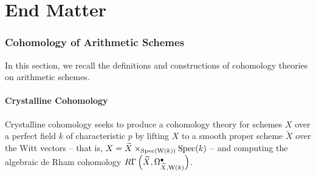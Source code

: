 \part*{End Matter}
\appendix
\section{Cohomology of Arithmetic Schemes}\label{app: cohomology of arithmetic schemes}
In this section, we recall the definitions and constructions of cohomology theories on arithmetic schemes. 
\subsection{Crystalline Cohomology}\label{app subsec: crystalline cohomology}
Crystalline cohomology seeks to produce a cohomology theory for schemes $X$ over a perfect field $k$ of characteristic $p$ by lifting $X$ to a smooth proper scheme $\widetilde{X}$ over the Witt vectors -- that is, $X=\widetilde{X}\times_{\operatorname{Spec}(\mathrm{W}(k))}\operatorname{Spec}(k)$ -- and computing the algebraic de Rham cohomology $R\Gamma\left(\widetilde{X},\Omega^{\bullet}_{\widetilde{X},\mathrm{W}(k)}\right)$. 

